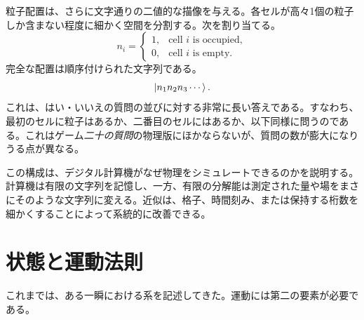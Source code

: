 粒子配置は、さらに文字通りの二値的な描像を与える。各セルが高々1個の粒子しか含まない程度に細かく空間を分割する。次を割り当てる。
\begin{equation}
  n_i=
  \begin{cases}
    1,&\text{cell \(i\) is occupied},\\
    0,&\text{cell \(i\) is empty}.
  \end{cases}
  \label{eq:l01-occupancy-bit}
\end{equation}
完全な配置は順序付けられた文字列である。
\begin{equation}
  \left\lvert n_1n_2n_3\cdots\right\rangle.
\end{equation}
これは、はい・いいえの質問の並びに対する非常に長い答えである。すなわち、最初のセルに粒子はあるか、二番目のセルにはあるか、以下同様に問うのである。これはゲーム\emph{二十の質問}の物理版にほかならないが、質問の数が膨大になりうる点が異なる。

この構成は、デジタル計算機がなぜ物理をシミュレートできるのかを説明する。計算機は有限の文字列を記憶し、一方、有限の分解能は測定された量や場をまさにそのような文字列に変える。近似は、格子、時間刻み、または保持する桁数を細かくすることによって系統的に改善できる。

\begin{classroomqa}
\end{classroomqa}

\begin{classroomqa}
\end{classroomqa}

\section{状態と運動法則}

これまでは、ある一瞬における系を記述してきた。運動には第二の要素が必要である。

